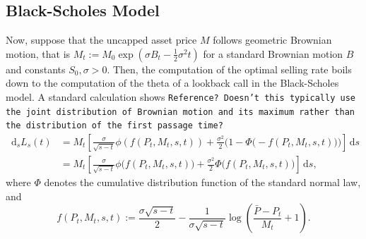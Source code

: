 \documentclass[11pt]{article}
\theoremstyle{definition}
\theoremstyle{remark}
\newcommand{\ts}{\textstyle}
\newcommand{\de}{\,\mathrm{d}}
\begin{document}
\subsection{Black-Scholes Model}
Now, suppose that the uncapped asset price $M$ follows geometric Brownian motion, that is $M_t:=M_0\exp\left(\sigma B_t-\frac{1}{2}\sigma^2 t\right)$ for a standard Brownian motion $B$ and constants $S_0, \sigma >0$. Then, the computation of the optimal selling rate boils down to the computation of the theta of a lookback call in the Black-Scholes model. A standard calculation shows \texttt{Reference? Doesn't this typically use the joint distribution of Brownian motion and its maximum rather than the distribution of the first passage time?}
\begin{align*}
\de_s L_s(t) &= M_t\left[ \frac{\sigma}{\sqrt{s-t}}\phi\left(f(P_t,M_t,s,t)\right)+\frac{\sigma^2}{2}\Big(1 - \Phi\bigl(-f(P_t,M_t,s,t)\bigr)\Big)\right] \de s\\
  &= M_t\left[ \frac{\sigma}{\sqrt{s-t}}\phi\bigl(f(P_t,M_t,s,t)\bigr)+\frac{\sigma^2}{2}\Phi\bigl(f(P_t,M_t,s,t)\bigr)\right] \de s,
\end{align*}
where $\Phi$ denotes the cumulative distribution function of the standard normal law, and
\[
 f(P_t,M_t,s,t) := \frac{\sigma\sqrt{s-t}}{2} - \frac{1}{\sigma\sqrt{s-t}}\log\left(\frac{\bar{P}-P_t}{M_t}+1\right).
\]
\end{document}
